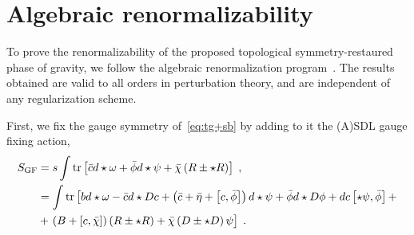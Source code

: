 \documentclass[../main.tex]{subfiles}
\begin{document}
\section{Algebraic renormalizability}%
\label{sec:quantum}

To prove the renormalizability of the proposed topological symmetry-restaured phase of gravity, we follow the algebraic renormalization program~\cite{piguet1995b}. The results obtained are valid to all orders in perturbation theory, and are independent of any regularization scheme.

First, we fix the gauge symmetry of~\eqref{eq:tg+sb} by adding to it the (A)SDL gauge fixing action,
\begin{subequations}%
  \label{eq:tg-gf-action}
  \begin{align}
    S_{\text{GF}} & = s \int \tr \left[ \bar{c} d \star \omega + \bar{\phi} d \star \psi + \bar{\chi} \left( R \pm \star R \right) \right] \;,                                                                                                                  \\
                  & = \int \tr \left[ b d \star \omega - \bar{c} d \star Dc + \left( \bar{c} + \bar{\eta} + \left[ c,\bar{\phi} \right] \right) d \star \psi + \bar{\phi} d \star D \phi + d c \left[ \star \psi ,\bar{\phi} \right] + \right. \nonumber        \\
                  & + \left. \left( B + \left[ c,\bar{\chi} \right] \right) \left( R \pm \star R \right) + \bar{\chi} \left( D \pm \star D \right) \psi \vphantom{ \left( \bar{c} + \bar{\eta} + \left[ c,\bar{\phi} \right] \right) d \star \psi } \right] \;.
  \end{align}
\end{subequations}
\end{document}

